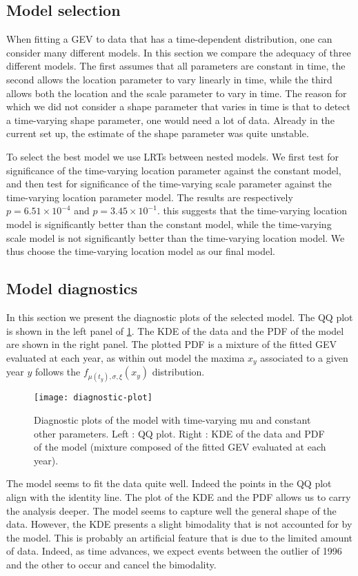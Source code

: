 \documentclass[a4paper, 12pt,oneside]{article}
\begin{document}
        \subsection{Model selection}
        When fitting a GEV to data that has a time-dependent distribution, one can consider many different models. In this section we compare the adequacy of three different models. The first assumes that all parameters are constant in time, the second allows the location parameter to vary linearly in time, while the third allows both the location and the scale parameter to vary in time. The reason for which we did not consider a shape parameter that varies in time is that to detect a time-varying shape parameter, one would need a lot of data. Already in the current set up, the estimate of the shape parameter was quite unstable. 

        To select the best model we use LRTs between nested models. We first test for significance of the time-varying location parameter against the constant model, and then test for significance of the time-varying scale parameter against the time-varying location parameter model. The results are respectively $p=6.51\times 10^{-4}$ and $p=3.45\times 10^{-1}$. this suggests that the time-varying location model is significantly better than the constant model, while the time-varying scale model is not significantly better than the time-varying location model. We thus choose the time-varying location model as our final model.
        \subsection{Model diagnostics}
        In this section we present the diagnostic plots of the selected model. The QQ plot is shown in the left panel of \ref{fig:diagnostic-plot}. The KDE of the data and the PDF of the model are shown in the right panel. The plotted PDF is a mixture of the fitted GEV evaluated at each year, as within out model the maxima $x_y$ associated to a given year $y$ follows the $f_{\mu(t_y),\sigma,\xi}(x_y)$ distribution.
        \begin{figure}[h!]
            \centering
            \vspace{0em}
            \texttt{[image: diagnostic-plot]}
            \caption{Diagnostic plots of the model with time-varying mu and constant other parameters. Left : QQ plot. Right : KDE of the data and PDF of the model (mixture composed of the fitted GEV evaluated at each year).}
            \label{fig:diagnostic-plot}
        \end{figure}
        The model seems to fit the data quite well. Indeed the points in the QQ plot align with the identity line. The plot of the KDE and the PDF allows us to carry the analysis deeper. The model seems to capture well the general shape of the data. However, the KDE presents a slight bimodality that is not accounted for by the model. This is probably an artificial feature that is due to the limited amount of data. Indeed, as time advances, we expect events between the outlier of 1996 and the other to occur and cancel the bimodality.  
\end{document}
